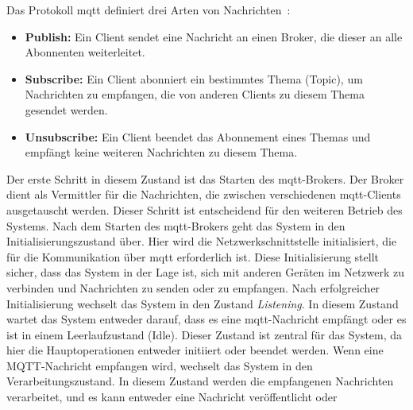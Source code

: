 Das Protokoll \gls{mqtt} definiert drei Arten von Nachrichten~\cite{mqtt}:
\begin{itemize}
    \item \textbf{Publish:} Ein Client sendet eine Nachricht an einen Broker, die dieser an alle Abonnenten weiterleitet.
    \item \textbf{Subscribe:} Ein Client abonniert ein bestimmtes Thema (Topic), um Nachrichten zu empfangen, die von anderen
          Clients zu diesem Thema gesendet werden.
    \item \textbf{Unsubscribe:} Ein Client beendet das Abonnement eines Themas und empfängt keine weiteren Nachrichten zu
          diesem Thema.
\end{itemize}
Der erste Schritt in diesem Zustand ist das Starten des \gls{mqtt}-Brokers.
Der Broker dient als Vermittler für die Nachrichten, die zwischen verschiedenen \gls{mqtt}-Clients ausgetauscht werden.
Dieser Schritt ist entscheidend für den weiteren Betrieb des Systems.
Nach dem Starten des \gls{mqtt}-Brokers geht das System in den Initialisierungszustand über.
Hier wird die Netzwerkschnittstelle initialisiert, die für die Kommunikation über \gls{mqtt} erforderlich ist.
Diese Initialisierung stellt sicher, dass das System in der Lage ist, sich mit anderen Geräten im Netzwerk zu verbinden
und Nachrichten zu senden oder zu empfangen.
Nach erfolgreicher Initialisierung wechselt das System in den Zustand \textit{Listening}.
In diesem Zustand wartet das System entweder darauf, dass es eine \gls{mqtt}-Nachricht empfängt oder es ist in einem Leerlaufzustand (Idle).
Dieser Zustand ist zentral für das System, da hier die Hauptoperationen entweder initiiert oder beendet werden.
Wenn eine MQTT-Nachricht empfangen wird, wechselt das System in den Verarbeitungszustand.
In diesem Zustand werden die empfangenen Nachrichten verarbeitet, und es kann entweder eine Nachricht veröffentlicht oder
